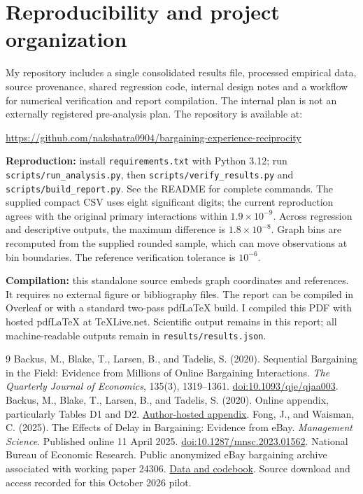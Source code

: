 \documentclass[11pt,a4paper]{article}
\begin{document}
\section{Reproducibility and project organization}
My repository includes a single consolidated results file, processed
empirical data, source provenance, shared regression code, internal design
notes and a workflow for numerical verification and report compilation.
The internal plan is not an externally registered pre-analysis plan.
The repository is available at:
\begin{center}\small
\url{https://github.com/nakshatra0904/bargaining-experience-reciprocity}
\end{center}

\textbf{Reproduction:} install \texttt{requirements.txt} with Python 3.12;
run \texttt{scripts/run\_analysis.py}, then
\texttt{scripts/verify\_results.py} and \texttt{scripts/build\_report.py}.
See the README for complete commands. The supplied compact CSV uses eight
significant digits; the current reproduction agrees with the original primary
interactions within $1.9\times10^{-9}$. Across regression and descriptive outputs,
the maximum difference is $1.8\times10^{-8}$. Graph bins are recomputed from the
supplied rounded sample, which can move observations at bin boundaries. The
reference verification tolerance is $10^{-6}$.

\textbf{Compilation:} this standalone source embeds graph coordinates and
references. It requires no external figure or bibliography files. The report
can be compiled in Overleaf or with a standard two-pass pdfLaTeX build.
I compiled this PDF with hosted pdfLaTeX at TeXLive.net. Scientific output remains
in this report; all machine-readable outputs
remain in \texttt{results/results.json}.

\begin{thebibliography}{9}
 Backus, M., Blake, T., Larsen, B., and Tadelis, S. (2020).
Sequential Bargaining in the Field: Evidence from Millions of Online Bargaining
Interactions. \emph{The Quarterly Journal of Economics}, 135(3), 1319--1361.
\href{https://doi.org/10.1093/qje/qjaa003}{doi:10.1093/qje/qjaa003}.
 Backus, M., Blake, T., Larsen, B., and Tadelis, S. (2020).
Online appendix, particularly Tables D1 and D2.
\href{https://faculty.haas.berkeley.edu/stadelis/BargainingOnlineAppendix.pdf}{Author-hosted appendix}.
 Fong, J., and Waisman, C. (2025).
The Effects of Delay in Bargaining: Evidence from eBay. \emph{Management Science}.
Published online 11 April 2025.
\href{https://doi.org/10.1287/mnsc.2023.01562}{doi:10.1287/mnsc.2023.01562}.
 National Bureau of Economic Research. Public anonymized eBay
bargaining archive associated with working paper 24306.
\href{https://back.nber.org/appendix/w24306/bargaining/}{Data and codebook}.
Source download and access recorded for this October 2026 pilot.
\end{thebibliography}
\clearpage\appendix
\end{document}
